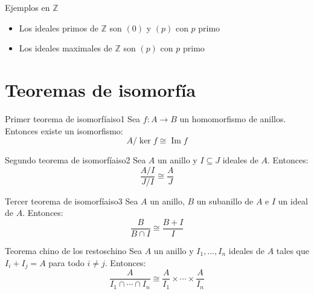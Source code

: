 \begin{example}{Ejemplos en \(\mathbb{Z}\)}{}
    \begin{itemize}
        \item Los ideales primos de \(\mathbb{Z}\) son \((0)\) y \((p)\) con \(p\) primo
        \item Los ideales maximales de \(\mathbb{Z}\) son \((p)\) con \(p\) primo
    \end{itemize}
\end{example}

\clearpage
\section{Teoremas de isomorfía}

\begin{theorem}{Primer teorema de isomorfía}{iso1}
    Sea \(f: A \to B\) un homomorfismo de anillos. Entonces existe un isomorfismo:
    \[
    A/\ker f \cong \operatorname{Im} f
    \]
\end{theorem}

\begin{theorem}{Segundo teorema de isomorfía}{iso2}
    Sea \(A\) un anillo y \(I \subseteq J\) ideales de \(A\). Entonces:
    \[
    \frac{A/I}{J/I} \cong \frac{A}{J}
    \]
\end{theorem}

\begin{theorem}{Tercer teorema de isomorfía}{iso3}
    Sea \(A\) un anillo, \(B\) un subanillo de \(A\) e \(I\) un ideal de \(A\). Entonces:
    \[
    \frac{B}{B \cap I} \cong \frac{B + I}{I}
    \]
\end{theorem}

\begin{theorem}{Teorema chino de los restos}{chino}
    Sea \(A\) un anillo y \(I_1, \ldots, I_n\) ideales de \(A\) tales que \(I_i + I_j = A\) para todo \(i \neq j\). Entonces:
    \[
    \frac{A}{I_1 \cap \cdots \cap I_n} \cong \frac{A}{I_1} \times \cdots \times \frac{A}{I_n}
    \]
\end{theorem}